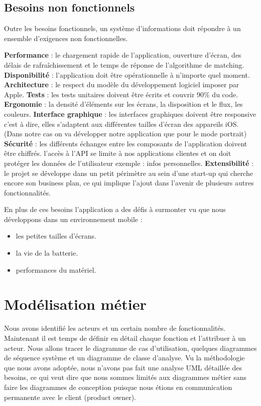 \subsection{Besoins non fonctionnels} %
\label{sub:besoins_non_fonctionnels}
Outre les besoins fonctionnels, un système d'informations doit répondre à un ensemble d'exigences non fonctionnelles.
\begin{itemize}
	\itemb \textbf{Performance} : le chargement rapide de l’application, ouverture d’écran, des délais de rafraîchissement et le temps de réponse de l'algorithme de matching.
	\itemb \textbf{Disponibilité} : l'application doit être opérationnelle à n'importe quel moment.
	\itemb \textbf{Architecture} : le respect du modèle du développement logiciel imposer par Apple.
	\itemb \textbf{Tests} : les tests unitaires doivent être écrits et couvrir 90\% du code.
	\itemb \textbf{Ergonomie} : la densité d’éléments sur les écrans, la disposition et le flux, les couleurs.
	\itemb \textbf{Interface graphique} : les interfaces graphiques doivent être responsive c'est à dire, elles s'adaptent aux différentes tailles d’écran des appareils iOS. (Dans notre cas on va développer notre application que pour le mode portrait)
	\itemb \textbf{Sécurité} : les différents échanges entre les composants de l'application doivent être chiffrés. l’accès à l'API se limite à nos applications clientes et on doit protéger les données de l'utilisateur exemple : infos personnelles.
	\itemb \textbf{Extensibilité} : le projet se développe dans un petit périmètre au sein d'une start-up qui cherche encore son business plan, ce qui implique l'ajout dans l'avenir de plusieurs autres fonctionnalités.
\end{itemize}
En plus de ces besoins l'application a des défis à surmonter vu que nous développons dans un environnement mobile : 
\begin{itemize}
	\item les petites tailles d’écrans.
	\item la vie de la batterie.
	\item performances du matériel.
\end{itemize}

\section{Modélisation métier}
Nous avons identifié les acteurs et un certain nombre de fonctionnalités. Maintenant il est temps de définir en détail chaque fonction et l'attribuer à un acteur.
Nous allons tracer le diagramme de cas d'utilisation, quelques diagrammes de séquence système et un diagramme de classe d'analyse.\newline
Vu la méthodologie que nous avons adoptée, nous n’avons pas fait une analyse UML détaillée des besoins, ce qui veut dire que nous sommes limités aux diagrammes métier sans faire les diagrammes de conception puisque nous étions en communication permanente avec le client (product owner).
